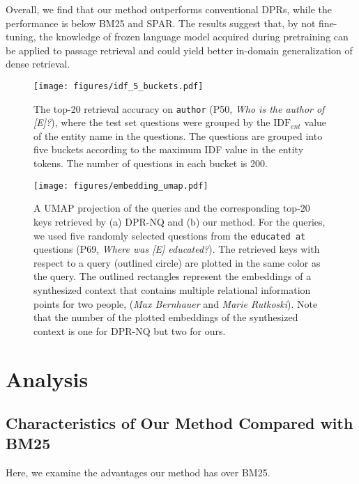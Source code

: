 \documentclass[letterpaper]{article} \usepackage{aaai23}  \usepackage{times}  \usepackage{helvet}  \usepackage{courier}  \usepackage[hyphens]{url}  \usepackage{graphicx} \urlstyle{rm} \def\UrlFont{\rm}  \usepackage{natbib}  \usepackage{caption} \frenchspacing  \setlength{\pdfpagewidth}{8.5in}  \setlength{\pdfpageheight}{11in}  \usepackage{algorithm}
\begin{document}
Overall, we find that our method outperforms conventional DPRs, while the performance is below BM25 and SPAR.
The results suggest that, by not fine-tuning, the knowledge of frozen language model acquired during pretraining can be applied to passage retrieval and could yield better in-domain generalization of dense retrieval.






\begin{figure}
	\centering
	\texttt{[image: figures/idf\_5\_buckets.pdf]}
	\caption{
		The top-20 retrieval accuracy on \texttt{\small author} (P50, \textit{Who is the author of [E]?}), where the test set questions were grouped by the $\mathrm{IDF}_{ent}$ value of the entity name in the questions.
		The questions are grouped into five buckets according to the maximum IDF value in the entity tokens.
		The number of questions in each bucket is 200.
}
	\label{fig:idf}
\end{figure}


\begin{figure*}[t]
	\centering
	\texttt{[image: figures/embedding\_umap.pdf]}
	\caption{
		A UMAP projection of the queries and the corresponding top-20 keys retrieved by (a) DPR-NQ and (b) our method.
		For the queries, we used five randomly selected questions from the \texttt{\small educated at} questions (P69, \textit{Where was [E] educated?}).
		The retrieved keys with respect to a query (outlined circle) are plotted in the same color as the query.
		The outlined rectangles represent the embeddings of a synthesized context that contains multiple relational information points for two people, (\textit{Max Bernhauer} and \textit{Marie Rutkoski}).
		Note that the number of the plotted embeddings of the synthesized context is one for DPR-NQ but two for ours.
	}
	\label{fig:embedding_umap}
\end{figure*}


\section{Analysis}\label{sec:analysis}

\subsection{Characteristics of Our Method Compared with BM25}\label{sec:exp_idf}
Here, we examine the advantages our method has over BM25.
\end{document}
